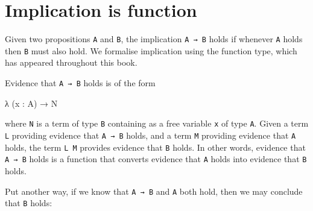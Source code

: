 \hypertarget{Connectives-implication}{%
\section{Implication is function}\label{Connectives-implication}}

Given two propositions \texttt{A} and \texttt{B}, the implication
\texttt{A\ →\ B} holds if whenever \texttt{A} holds then \texttt{B} must
also hold. We formalise implication using the function type, which has
appeared throughout this book.

Evidence that \texttt{A\ →\ B} holds is of the form

\begin{myDisplay}
λ (x : A) → N
\end{myDisplay}

where \texttt{N} is a term of type \texttt{B} containing as a free
variable \texttt{x} of type \texttt{A}. Given a term \texttt{L}
providing evidence that \texttt{A\ →\ B} holds, and a term \texttt{M}
providing evidence that \texttt{A} holds, the term \texttt{L\ M}
provides evidence that \texttt{B} holds. In other words, evidence that
\texttt{A\ →\ B} holds is a function that converts evidence that
\texttt{A} holds into evidence that \texttt{B} holds.

Put another way, if we know that \texttt{A\ →\ B} and \texttt{A} both
hold, then we may conclude that \texttt{B} holds:

\begin{fence}
\begin{code}%
\>[0]\AgdaSpace{}%
\AgdaSymbol{:}\AgdaSpace{}%
\AgdaSpace{}%
\AgdaSymbol{\{}\AgdaSpace{}%
\AgdaSpace{}%
\AgdaSymbol{:}\AgdaSpace{}%
\AgdaSymbol{\}}\<%
\\
\>[0][@{}l@{\AgdaIndent{0}}]%
\>[2]\AgdaSpace{}%
\AgdaSymbol{(}\AgdaSpace{}%
\AgdaSpace{}%
\AgdaSymbol{)}\<%
\\
%
\>[2]%
\>[637I]\<%
\\
\>[.][@{}l@{}]\<[637I]%
\>[4]\AgdaComment{-------}\<%
\\
%
\>[2]\AgdaSpace{}%
\<%
\\
\>[0]\AgdaSpace{}%
\AgdaSpace{}%
\AgdaSpace{}%
\AgdaSymbol{=}\AgdaSpace{}%
\AgdaSpace{}%
\<%
\end{code}
\end{fence}

